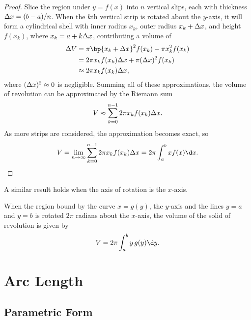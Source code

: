 \begin{proof}
    Slice the region under $y = f(x)$ into $n$ vertical slips, each with thickness $\Delta x = (b-a)/n$. When the $k$th vertical strip is rotated about the $y$-axis, it will form a cylindrical shell with inner radius $x_k$, outer radius $x_k + \Delta x$, and height $f(x_k)$, where $x_k = a + k \Delta x$, contributing a volume of
    \begin{align*}
        \D V &= \pi \bp{x_k + \D x}^2 f(x_k) - \pi x_k^2 f(x_k)\\
        &= 2 \pi x_k f(x_k) \D x + \pi (\D x)^2 f(x_k)\\
        &\approx 2 \pi x_k f(x_k) \D x,
    \end{align*}
    where $(\Delta x)^2 \approx 0$ is negligible. Summing all of these approximations, the volume of revolution can be approximated by the Riemann sum \[V \approx \sum_{k = 0}^{n-1} 2 \pi x_k f(x_k) \Delta x.\] As more strips are considered, the approximation becomes exact, so \[V = \lim_{n \to \infty} \sum_{k = 0}^{n-1} 2 \pi x_k f(x_k) \D x = 2\pi \int_a^b xf(x) \d x.\]
\end{proof}

A similar result holds when the axis of rotation is the $x$-axis.

\begin{proposition}
    When the region bound by the curve $x = g(y)$, the $y$-axis and the lines $y = a$ and $y = b$ is rotated $2\pi$ radians about the $x$-axis, the volume of the solid of revolution is given by \[V = 2\pi \int_a^b y \, g(y) \d y.\]
\end{proposition}

\section{Arc Length}

\subsection{Parametric Form}

